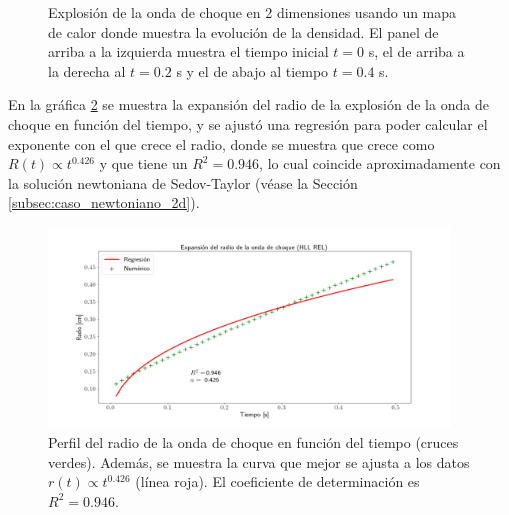 \documentclass[12pt,a4paper]{book}
\begin{document}
\begin{figure}
    \caption{Explosión de la onda de choque en 2 dimensiones usando un mapa de calor donde muestra
    la evolución de la densidad. El panel de arriba a la izquierda muestra el tiempo inicial $t=0$ s,
    el de arriba a la derecha  al $t = 0.2$ s y el de abajo al tiempo $t = 0.4$ s. 
    \label{fig:head_map}}
\end{figure}

En la gráfica \ref{fig:Expansion_radio_vs_tiempo} se muestra la expansión del radio de la explosión de la onda de choque en función del tiempo, y se ajustó una regresión para 
poder calcular el exponente con el que crece el radio, donde se muestra que crece como $R(t) \propto t^{0.426}$ y que tiene un $R^2 = 0.946$, lo cual coincide aproximadamente con la solución newtoniana de Sedov-Taylor 
(véase la Sección \ref{subsec:caso_newtoniano_2d}).

\begin{figure}
    \begin{center}
      \includegraphics[width=0.95\textwidth]{./Figuras/verificacion_del_codigo/pruebas_2D/expansion_radio/Expansion.png}
    \end{center}
    \caption{Perfil del radio de la onda de choque en función del tiempo (cruces verdes). Además, se muestra la curva que mejor se ajusta a los datos $r(t) \propto t^{0.426}$ (línea roja). El coeficiente de 
    determinación es $R^2 = 0.946$.}
    \label{fig:Expansion_radio_vs_tiempo}
\end{figure}
\end{document}
